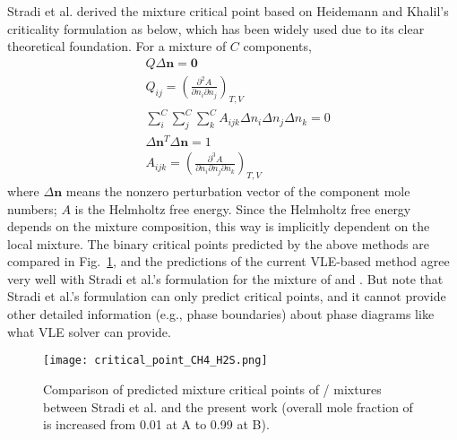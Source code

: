     Stradi et al. \cite{stradi2001reliable} derived the mixture critical point based on Heidemann and Khalil's criticality formulation \cite{heidemann1980calculation} as below, which has been widely used due to its clear theoretical foundation. For a mixture of $C$ components,
    \begin{align}
         & Q\Delta \mathbf n=\mathbf0                                                                          \\
         & Q_{ij}=\left( \frac{\partial^2A}{\partial n_i \partial n_j}\right)_{T,V}                            \\
         & \sum_i^{C}\sum_{j}^{C}\sum_{k}^{C}A_{ijk}\Delta n_i\Delta n_{j}\Delta n_{k}=0                       \\
         & \Delta \mathbf n^{T}\Delta \mathbf n=1                                                              \\
         & A_{ijk}=\left( \frac{\partial^3A}{\partial n_i \partial n_j\partial n_k}\right)_{T,V} \label{eq:19}
    \end{align}
    where $\Delta \mathbf n$ means the nonzero perturbation vector of the component mole numbers; $A$ is the Helmholtz free energy. Since the Helmholtz free energy depends on the mixture composition, this way is implicitly dependent on the local mixture. The binary critical points predicted by the above methods are compared in Fig.~\ref{v2}, and the predictions of the current VLE-based method agree very well with Stradi et al.'s formulation \cite{stradi2001reliable} for the mixture of  and . But note that Stradi et al.'s formulation can only predict critical points, and it cannot provide other detailed information (e.g., phase boundaries) about phase diagrams like what VLE solver can provide.


    \begin{figure}[htbp]
        \begin{center}
            \texttt{[image: critical\_point\_CH4\_H2S.png]}
        \end{center}
        \caption{Comparison of predicted mixture critical points of / mixtures between Stradi et al. \cite{stradi2001reliable} and the present work (overall mole fraction of  is increased from 0.01 at A to 0.99 at B).
        }
        \label{v2}
    \end{figure}

